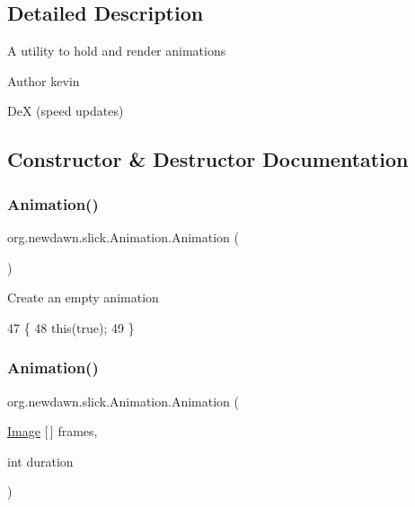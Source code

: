 \subsection{Detailed Description}
A utility to hold and render animations

\begin{DoxyAuthor}{Author}
kevin 

DeX (speed updates) 
\end{DoxyAuthor}


\subsection{Constructor \& Destructor Documentation}
\mbox{\label{classorg_1_1newdawn_1_1slick_1_1_animation_a1fe2a5ff67cb544ae398375729b5559c}} 
\subsubsection{\texorpdfstring{Animation()}{Animation()}\hspace{0.1cm}{\footnotesize\ttfamily [1/9]}}
{\footnotesize\ttfamily org.\+newdawn.\+slick.\+Animation.\+Animation (\begin{DoxyParamCaption}{ }\end{DoxyParamCaption})\hspace{0.3cm}{\ttfamily [inline]}}

Create an empty animation 
\begin{DoxyCode}
47                        \{
48         \textcolor{keyword}{this}(\textcolor{keyword}{true});
49     \}
\end{DoxyCode}
\mbox{\label{classorg_1_1newdawn_1_1slick_1_1_animation_a4ad4c409fb2092a338732517a8c303a8}} 
\subsubsection{\texorpdfstring{Animation()}{Animation()}\hspace{0.1cm}{\footnotesize\ttfamily [2/9]}}
{\footnotesize\ttfamily org.\+newdawn.\+slick.\+Animation.\+Animation (\begin{DoxyParamCaption}\item[{\mbox{\hyperlink{classorg_1_1newdawn_1_1slick_1_1_image}{Image}} \mbox{[}$\,$\mbox{]}}]{frames,  }\item[{int}]{duration }\end{DoxyParamCaption})\hspace{0.3cm}{\ttfamily [inline]}}

